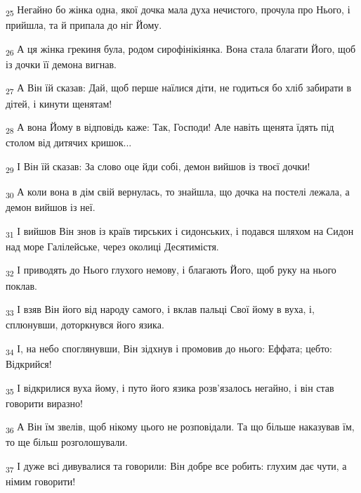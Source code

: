 \begin{tcolorbox}
\textsubscript{25} Негайно бо жінка одна, якої дочка мала духа нечистого, прочула про Нього, і прийшла, та й припала до ніг Йому.
\end{tcolorbox}
\begin{tcolorbox}
\textsubscript{26} А ця жінка грекиня була, родом сирофінікіянка. Вона стала благати Його, щоб із дочки її демона вигнав.
\end{tcolorbox}
\begin{tcolorbox}
\textsubscript{27} А Він їй сказав: Дай, щоб перше наїлися діти, не годиться бо хліб забирати в дітей, і кинути щенятам!
\end{tcolorbox}
\begin{tcolorbox}
\textsubscript{28} А вона Йому в відповідь каже: Так, Господи! Але навіть щенята їдять під столом від дитячих кришок...
\end{tcolorbox}
\begin{tcolorbox}
\textsubscript{29} І Він їй сказав: За слово оце йди собі, демон вийшов із твоєї дочки!
\end{tcolorbox}
\begin{tcolorbox}
\textsubscript{30} А коли вона в дім свій вернулась, то знайшла, що дочка на постелі лежала, а демон вийшов із неї.
\end{tcolorbox}
\begin{tcolorbox}
\textsubscript{31} І вийшов Він знов із країв тирських і сидонських, і подався шляхом на Сидон над море Галілейське, через околиці Десятимістя.
\end{tcolorbox}
\begin{tcolorbox}
\textsubscript{32} І приводять до Нього глухого немову, і благають Його, щоб руку на нього поклав.
\end{tcolorbox}
\begin{tcolorbox}
\textsubscript{33} І взяв Він його від народу самого, і вклав пальці Свої йому в вуха, і, сплюнувши, доторкнувся його язика.
\end{tcolorbox}
\begin{tcolorbox}
\textsubscript{34} І, на небо споглянувши, Він зідхнув і промовив до нього: Еффата; цебто: Відкрийся!
\end{tcolorbox}
\begin{tcolorbox}
\textsubscript{35} І відкрилися вуха йому, і путо його язика розв'язалось негайно, і він став говорити виразно!
\end{tcolorbox}
\begin{tcolorbox}
\textsubscript{36} А Він їм звелів, щоб нікому цього не розповідали. Та що більше наказував їм, то ще більш розголошували.
\end{tcolorbox}
\begin{tcolorbox}
\textsubscript{37} І дуже всі дивувалися та говорили: Він добре все робить: глухим дає чути, а німим говорити!
\end{tcolorbox}

